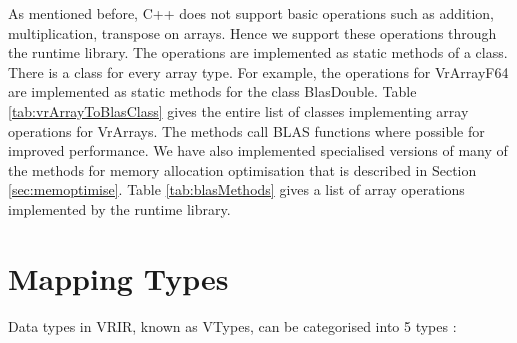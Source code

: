 As mentioned before, C++ does not support basic operations such as addition, multiplication, transpose on arrays. Hence we support these operations through the runtime library. The operations are implemented as static methods of a class. There is a class for every array type. For example, the operations for VrArrayF64 are implemented as static methods for the class BlasDouble. Table \ref{tab:vrArrayToBlasClass} gives the entire list of classes implementing array operations for VrArrays. The methods call BLAS functions where possible for improved performance. We have also implemented specialised versions of many of the methods for memory allocation optimisation that is described in Section \ref{sec:memoptimise}. Table \ref{tab:blasMethods} gives a list of array operations implemented by the runtime library.
\section{Mapping Types}
Data types in VRIR, known as VTypes, can be categorised into 5 types :
